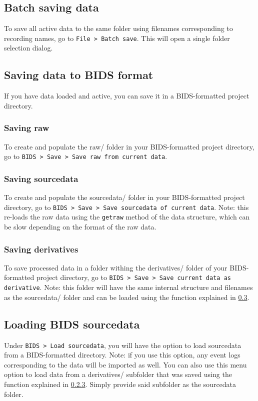 \documentclass{article}
\begin{document}
\subsection{Batch saving data}
To save all active data to the same folder using filenames corresponding to recording names, go to \texttt{File > Batch save}. This will open a single folder selection dialog.
\subsection{Saving data to BIDS format}
If you have data loaded and active, you can save it in a BIDS-formatted project directory.
\subsubsection{Saving raw}
To create and populate the raw/ folder in your BIDS-formatted project directory, go to \texttt{BIDS > Save > Save raw from current data}.
\subsubsection{Saving sourcedata}
To create and populate the sourcedata/ folder in your BIDS-formatted project directory, go to \texttt{BIDS > Save > Save sourcedata of current data}. Note: this re-loads the raw data using the \texttt{getraw} method of the data structure, which can be slow depending on the format of the raw data.
\subsubsection{Saving derivatives} \label{saving_derivatives}
To save processed data in a folder withing the derivatives/ folder of your BIDS-formatted project directory, go to \texttt{BIDS > Save > Save current data as derivative}. Note: this folder will have the same internal structure and filenames as the sourcedata/ folder and can be loaded using the function explained in \ref{load_sourcedata}.
\subsection{Loading BIDS sourcedata} \label{load_sourcedata}
Under \texttt{BIDS > Load sourcedata}, you will have the option to load sourcedata from a BIDS-formatted directory. Note: if you use this option, any event logs corresponding to the data will be imported as well. You can also use this menu option to load data from a derivatives/ subfolder that was saved using the function explained in \ref{saving_derivatives}. Simply provide said subfolder as the sourcedata folder.
\end{document}
